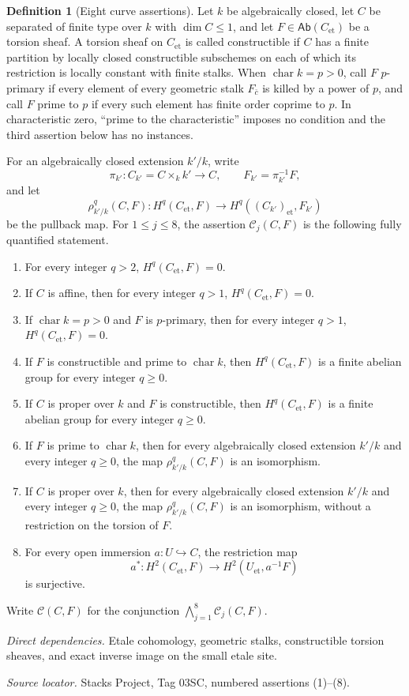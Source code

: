 \documentclass[10pt]{article}
\theoremstyle{definition}
\newtheorem{definition}[theorem]{Definition}
\newcommand{\Ab}{\mathsf{Ab}}
\newcommand{\Et}{\mathrm{et}}
\newcommand{\deps}[1]{\par\smallskip\textit{Direct dependencies.} #1\par}
\newcommand{\sources}[1]{\par\textit{Source locator.} #1\par}
\begin{document}
\begin{definition}[Eight curve assertions]
Let $k$ be algebraically closed, let $C$ be separated of finite type over
$k$ with $\dim C\leq1$, and let $F\in\Ab(C_{\Et})$ be a torsion sheaf.
A torsion sheaf on $C_{\Et}$ is called constructible if $C$ has a finite
partition by locally closed constructible subschemes on each of which its
restriction is locally constant with finite stalks.
When $\operatorname{char}k=p>0$, call $F$ $p$-primary if every element of
every geometric stalk $F_{\bar c}$ is killed by a power of $p$, and call
$F$ prime to $p$ if every such element has finite order coprime to $p$.
In characteristic zero, ``prime to the characteristic'' imposes no
condition and the third assertion below has no instances.

For an algebraically closed extension $k'/k$, write
\[
 \pi_{k'}:C_{k'}=C\times_k k'\longrightarrow C,
 \qquad F_{k'}=\pi_{k'}^{-1}F,
\]
and let
\[
 \rho^q_{k'/k}(C,F):H^q(C_{\Et},F)\longrightarrow
 H^q((C_{k'})_{\Et},F_{k'})
\]
be the pullback map.  For $1\leq j\leq8$, the assertion
$\mathcal C_j(C,F)$ is the following fully quantified statement.
\begin{enumerate}
\item[\textnormal{(C1)}] For every integer $q>2$,
$H^q(C_{\Et},F)=0$.
\item[\textnormal{(C2)}] If $C$ is affine, then for every integer $q>1$,
$H^q(C_{\Et},F)=0$.
\item[\textnormal{(C3)}] If $\operatorname{char}k=p>0$ and $F$ is
$p$-primary, then for every integer $q>1$, $H^q(C_{\Et},F)=0$.
\item[\textnormal{(C4)}] If $F$ is constructible and prime to
$\operatorname{char}k$, then $H^q(C_{\Et},F)$ is a finite abelian group
for every integer $q\geq0$.
\item[\textnormal{(C5)}] If $C$ is proper over $k$ and $F$ is
constructible, then $H^q(C_{\Et},F)$ is a finite abelian group for every
integer $q\geq0$.
\item[\textnormal{(C6)}] If $F$ is prime to $\operatorname{char}k$, then
for every algebraically closed extension $k'/k$ and every integer
$q\geq0$, the map $\rho^q_{k'/k}(C,F)$ is an isomorphism.
\item[\textnormal{(C7)}] If $C$ is proper over $k$, then for every
algebraically closed extension $k'/k$ and every integer $q\geq0$, the map
$\rho^q_{k'/k}(C,F)$ is an isomorphism, without a restriction on the
torsion of $F$.
\item[\textnormal{(C8)}] For every open immersion $a:U\hookrightarrow C$,
the restriction map
\[
 a^*:H^2(C_{\Et},F)\longrightarrow H^2(U_{\Et},a^{-1}F)
\]
is surjective.
\end{enumerate}
Write $\mathcal C(C,F)$ for the conjunction
$\bigwedge_{j=1}^8\mathcal C_j(C,F)$.
\end{definition}
\deps{Etale cohomology, geometric stalks, constructible torsion sheaves,
and exact inverse image on the small etale site.}
\sources{Stacks Project, Tag 03SC, numbered assertions (1)--(8).}
\end{document}
